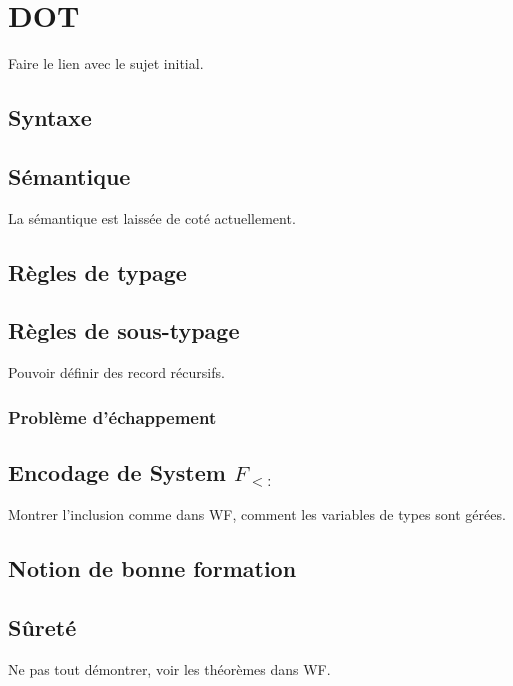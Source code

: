 \chapter{DOT}

Faire le lien avec le sujet initial.

\section{Syntaxe}

\section{Sémantique}

La sémantique est laissée de coté actuellement.

\section{Règles de typage}

\section{Règles de sous-typage}

Pouvoir définir des record récursifs.

\subsection*{Problème d'échappement}

\section{Encodage de System $F_{<:}$}

Montrer l'inclusion comme dans WF, comment les variables de types sont gérées.

\section{Notion de bonne formation}


\section{Sûreté}

Ne pas tout démontrer, voir les théorèmes dans WF.